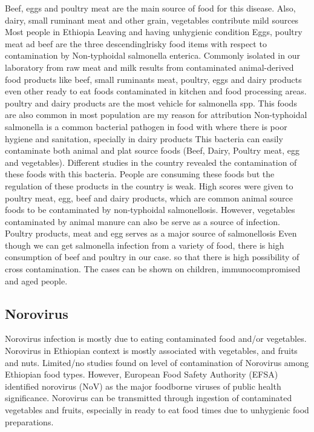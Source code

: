 \documentclass[
  letterpaper,
  DIV=11,
  numbers=noendperiod]{scrartcl}
\begin{document}
Beef, eggs and poultry meat are the main source of food for this
disease. Also, dairy, small ruminant meat and other grain, vegetables
contribute mild sources Most people in Ethiopia Leaving and having
unhygienic condition Eggs, poultry meat ad beef are the three
descendinglrisky food items with respect to contamination by
Non-typhoidal salmonella enterica. Commonly isolated in our laboratory
from raw meat and milk results from contaminated animal-derived food
products like beef, small ruminants meat, poultry, eggs and dairy
products even other ready to eat foods contaminated in kitchen and food
processing areas. poultry and dairy products are the most vehicle for
salmonella spp. This foods are also common in most population are my
reason for attribution Non-typhoidal salmonella is a common bacterial
pathogen in food with where there is poor hygiene and sanitation,
specially in dairy products This bacteria can easily contaminate both
animal and plat source foods (Beef, Dairy, Poultry meat, egg and
vegetables). Different studies in the country revealed the contamination
of these foods with this bacteria. People are consuming these foods but
the regulation of these products in the country is weak. High scores
were given to poultry meat, egg, beef and dairy products, which are
common animal source foods to be contaminated by non-typhoidal
salmonellosis. However, vegetables contaminated by animal manure can
also be serve as a source of infection. Poultry products, meat and egg
serves as a major source of salmonellosis Even though we can get
salmonella infection from a variety of food, there is high consumption
of beef and poultry in our case. so that there is high possibility of
cross contamination. The cases can be shown on children,
immunocompromised and aged people.

\subsection*{Norovirus}\label{norovirus}

Norovirus infection is mostly due to eating contaminated food and/or
vegetables. Norovirus in Ethiopian context is mostly associated with
vegetables, and fruits and nuts. Limited/no studies found on level of
contamination of Norovirus among Ethiopian food types. However, European
Food Safety Authority (EFSA) identified norovirus (NoV) as the major
foodborne viruses of public health significance. Norovirus can be
transmitted through ingestion of contaminated vegetables and fruits,
especially in ready to eat food times due to unhygienic food
preparations.
\end{document}
